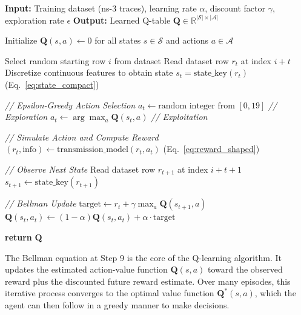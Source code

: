 \documentclass[pdflatex,sn-mathphys-num]{sn-jnl}%
\theoremstyle{thmstyleone}%
\theoremstyle{thmstyletwo}%
\theoremstyle{thmstylethree}%
\begin{document}
\begin{algorithm}[H]
\caption{Tabular Q-Learning for Combined Scheduling and Aggregation}
\begin{algorithmic}[1]
\State \textbf{Input:} Training dataset (ns-3 traces), learning rate $\alpha$, discount factor $\gamma$, exploration rate $\epsilon$
\State \textbf{Output:} Learned Q-table ${\mathbf{Q} \in \mathbb{R}^{|\mathcal{S}| \times |\mathcal{A}|}}$

\State Initialize $\mathbf{Q}(s, a) \leftarrow 0$ for all states $s \in \mathcal{S}$ and actions $a \in \mathcal{A}$

    \State Select random starting row $i$ from dataset
        \State Read dataset row $r_t$ at index $i+t$
        \State Discretize continuous features to obtain state $s_t = \text{state\_key}(r_t)$ (Eq.~\ref{eq:state_compact})
        
        \State \textit{// Epsilon-Greedy Action Selection}
            \State $a_t \leftarrow \text{random integer from } [0, 19]$ \quad \textit{// Exploration}
        \Else
            \State $a_t \leftarrow \arg\max_a \mathbf{Q}(s_t, a)$ \quad \textit{// Exploitation}
        \EndIf
        
        \State \textit{// Simulate Action and Compute Reward}
        \State $(r_t, \text{info}) \leftarrow \text{transmission\_model}(r_t, a_t)$ (Eq.~\ref{eq:reward_shaped})
        
        \State \textit{// Observe Next State}
        \State Read dataset row $r_{t+1}$ at index $i+t+1$
        \State $s_{t+1} \leftarrow \text{state\_key}(r_{t+1})$
        
        \State \textit{// Bellman Update}
        \State $\text{target} \leftarrow r_t + \gamma \max_a \mathbf{Q}(s_{t+1}, a)$
        \State $\mathbf{Q}(s_t, a_t) \leftarrow (1-\alpha) \mathbf{Q}(s_t, a_t) + \alpha \cdot \text{target}$
    \EndFor
\EndFor

\State \textbf{return} $\mathbf{Q}$
\end{algorithmic}
\end{algorithm}

The Bellman equation at Step 9 is the core of the Q-learning algorithm. It updates the estimated action-value function $\mathbf{Q}(s,a)$ toward the observed reward plus the discounted future reward estimate. Over many episodes, this iterative process converges to the optimal value function $\mathbf{Q}^*(s,a)$, which the agent can then follow in a greedy manner to make decisions.
\end{document}
